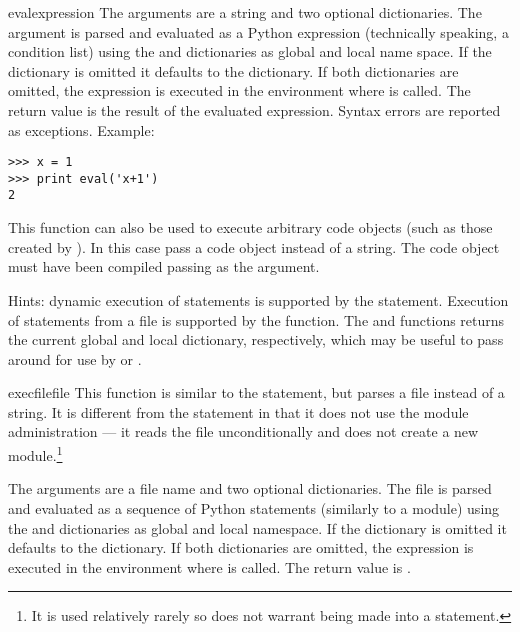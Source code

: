 \begin{funcdesc}{eval}{expression}
  The arguments are a string and two optional dictionaries.  The
   argument is parsed and evaluated as a Python
  expression (technically speaking, a condition list) using the
   and  dictionaries as global and local name
  space.  If the  dictionary is omitted it defaults to
  the  dictionary.  If both dictionaries are omitted, the
  expression is executed in the environment where  is
  called.  The return value is the result of the evaluated expression.
  Syntax errors are reported as exceptions.  Example:

\begin{verbatim}
>>> x = 1
>>> print eval('x+1')
2
\end{verbatim}

  This function can also be used to execute arbitrary code objects
  (such as those created by ).  In this case pass
  a code object instead of a string.  The code object must have been
  compiled passing  as the  argument.

  Hints: dynamic execution of statements is supported by the
   statement.  Execution of statements from a file is
  supported by the  function.  The
   and  functions returns the
  current global and local dictionary, respectively, which may be
  useful to pass around for use by  or
  .
\end{funcdesc}

\begin{funcdesc}{execfile}{file}
  This function is similar to the
   statement, but parses a file instead of a string.  It
  is different from the  statement in that it does not
  use the module administration --- it reads the file unconditionally
  and does not create a new module.\footnote{It is used relatively
  rarely so does not warrant being made into a statement.}

  The arguments are a file name and two optional dictionaries.  The
  file is parsed and evaluated as a sequence of Python statements
  (similarly to a module) using the  and 
  dictionaries as global and local namespace.  If the 
  dictionary is omitted it defaults to the  dictionary.
  If both dictionaries are omitted, the expression is executed in the
  environment where  is called.  The return value is
  .

\end{funcdesc}


